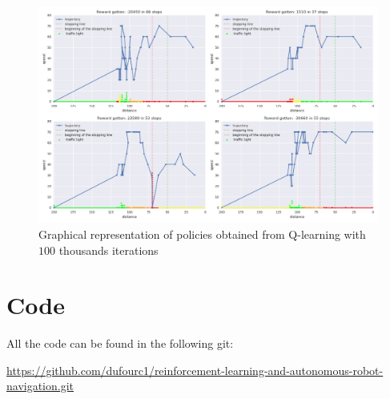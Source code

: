 \documentclass[14pt,a4paper]{article}
\theoremstyle{definition}
\begin{document}
\begin{figure}[H]
\centering
\includegraphics[scale=0.4]{img/traj3.png}
\caption{Graphical representation of  policies obtained from Q-learning with $100$ thousands  iterations}
\label{failure}
\end{figure}


\section{Code} \label{code}

All the code can be found in the following git:

 \url{https://github.com/dufourc1/reinforcement-learning-and-autonomous-robot-navigation.git}



%










\nocite{Watkins_phd}
\newpage
{}




\end{document}
